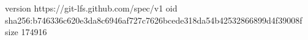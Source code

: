version https://git-lfs.github.com/spec/v1
oid sha256:b746336c620e3da8c6946af727c7626bcede318da54b42532866899d4f39008f
size 174916
